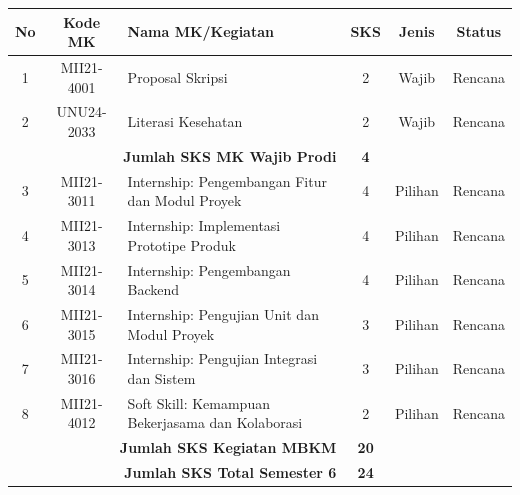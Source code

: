 \documentclass[a4paper,12pt]{article}
\begin{document}
\begin{table}[H]
    \centering
    \begin{tabular}{|c|c|p{6.5cm}|c|c|c|}
        \hline
        \textbf{No} & \textbf{Kode MK} & \textbf{Nama MK/Kegiatan} & \textbf{SKS} & \textbf{Jenis} & \textbf{Status} \\
        \hline
        1 & MII21-4001 & Proposal Skripsi & 2 & Wajib & Rencana \\
        2 & UNU24-2033 & Literasi Kesehatan & 2 & Wajib & Rencana \\
        \hline
        \multicolumn{3}{|r|}{\textbf{Jumlah SKS MK Wajib Prodi}} & \textbf{4} & & \\
        \hline
        3 & MII21-3011 & Internship: Pengembangan Fitur dan Modul Proyek & 4 & Pilihan & Rencana \\
        4 & MII21-3013 & Internship: Implementasi Prototipe Produk & 4 & Pilihan & Rencana \\
        5 & MII21-3014 & Internship: Pengembangan Backend & 4 & Pilihan & Rencana \\
        6 & MII21-3015 & Internship: Pengujian Unit dan Modul Proyek & 3 & Pilihan & Rencana \\
        7 & MII21-3016 & Internship: Pengujian Integrasi dan Sistem & 3 & Pilihan & Rencana \\
        8 & MII21-4012 & Soft Skill: Kemampuan Bekerjasama dan Kolaborasi & 2 & Pilihan & Rencana \\
        \hline
        \multicolumn{3}{|r|}{\textbf{Jumlah SKS Kegiatan MBKM}} & \textbf{20} & & \\
        \hline
        \multicolumn{3}{|r|}{\textbf{Jumlah SKS Total Semester 6}} & \textbf{24} & & \\
        \hline
    \end{tabular}
\end{table}
\end{document}
